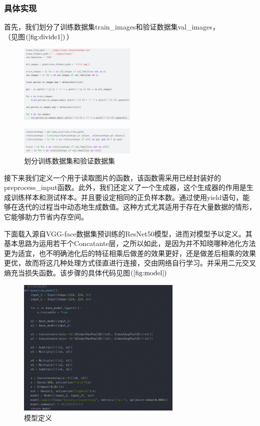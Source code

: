 \documentclass[UTF8]{ctexart}
\begin{document}
\subsubsection{具体实现}
首先，我们划分了训练数据集train\_images和验证数据集val\_images，\\
（见图$\left(\ref{fig:divide1}\right)$）
\begin{figure}[!ht]
  \centering
  \includegraphics[width=0.5\textwidth]{divide.jpg}
  \label{fig:divide}
\end{figure}
\begin{figure}[!ht]
  \centering
  \includegraphics[width=0.5\textwidth]{divide1.jpg}
  \caption{划分训练数据集和验证数据集}
  \label{fig:divide1}
\end{figure}
接下来我们定义一个用于读取图片的函数，该函数需采用已经封装好的preprocess\_input函数。此外，我们还定义了一个生成器，这个生成器的作用是生成训练样本和测试样本。并且要设定相同的正负样本数。通过使用yield语句，能够在迭代的过程当中动态地生成数值。这种方式尤其适用于存在大量数据的情形，它能够助力节省内存空间。

下面载入源自VGG-face数据集预训练的ResNet50模型，进而对模型予以定义。其基本思路为运用若干个Concatante层，之所以如此，是因为并不知晓哪种池化方法更为适宜，也不明确池化后的特征相乘后做差的效果更好，还是做差后相乘的效果更优，故而将这几种处理方式径直进行连接，交由网络自行学习。并采用二元交叉熵充当损失函数。该步骤的具体代码见图$\left(\ref{fig:model}\right)$
\begin{figure}[!ht]
  \centering
  \includegraphics[width=0.7\textwidth]{model.jpg}
  \caption{模型定义}
  \label{fig:model}
\end{figure}
\end{document}
